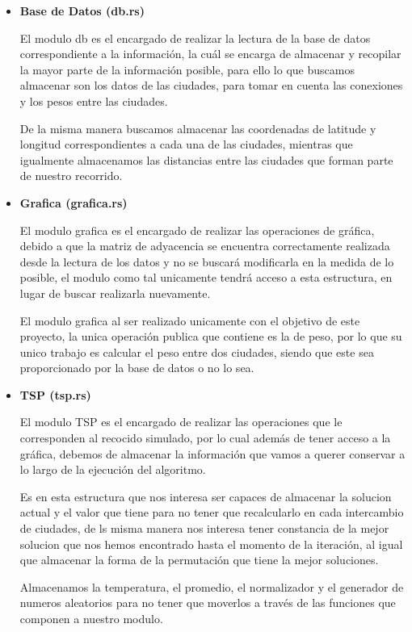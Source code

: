 \begin{multicols}{2}
\begin{itemize}
 \item \textbf{Base de Datos (db.rs)}
   
 El modulo db es el encargado de realizar la lectura de la base de datos correspondiente a la información, la cuál se encarga de almacenar y recopilar la mayor parte de la información posible, para ello lo que buscamos almacenar son los datos de las ciudades, para tomar en cuenta las conexiones y los pesos entre las ciudades.

 De la misma manera buscamos almacenar las coordenadas de latitude y longitud correspondientes a cada una de las ciudades, mientras que igualmente almacenamos las distancias entre las ciudades que forman parte de nuestro recorrido.

\item \textbf{Grafica (grafica.rs)}

  El modulo grafica es el encargado de realizar las operaciones de gráfica, debido a que la matriz de adyacencia se encuentra correctamente realizada desde la lectura de los datos y no se buscará modificarla en la medida de lo posible, el modulo como tal unicamente tendrá acceso a esta estructura, en lugar de buscar realizarla nuevamente.

  El modulo grafica al ser realizado unicamente con el objetivo de este proyecto, la unica operación publica que contiene es la de peso, por lo que su unico trabajo es calcular el peso entre dos ciudades, siendo que este sea proporcionado por la base de datos o no lo sea. 
  
\item \textbf{TSP (tsp.rs)}

  El modulo TSP es el encargado de realizar las operaciones que le corresponden al recocido simulado, por lo cual además de tener acceso a la gráfica, debemos de almacenar la información que vamos a querer conservar a lo largo de la ejecución del algoritmo.

  Es en esta estructura que nos interesa ser capaces de almacenar la solucion actual y el valor que tiene para no tener que recalcularlo en cada intercambio de ciudades, de ls misma manera nos interesa tener constancia de la mejor solucion que nos hemos encontrado hasta el momento de la iteración, al igual que almacenar la forma de la permutación que tiene la mejor soluciones.

  Almacenamos la temperatura, el promedio, el normalizador y el generador de numeros aleatorios para no tener que moverlos a través de las funciones que componen a nuestro modulo.


\end{itemize}
\end{multicols}

